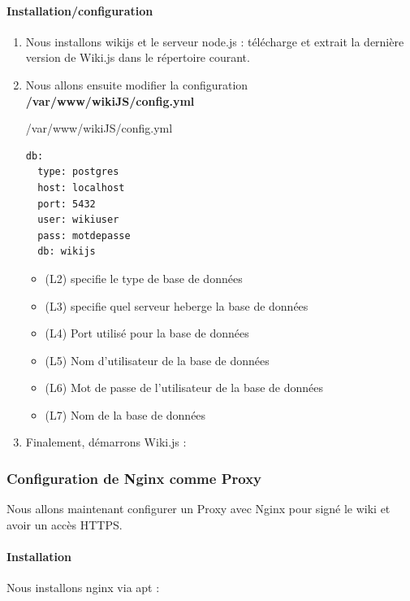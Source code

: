 \documentclass{article}
\begin{document}
\paragraph{Installation/configuration\\}
\begin{enumerate}
	\item Nous installons wikijs et le serveur node.js :
télécharge et extrait la dernière version de Wiki.js dans le répertoire courant.
	
	\item Nous allons ensuite modifier la configuration \textbf{/var/www/wikiJS/config.yml}
	\begin{configbox}{/var/www/wikiJS/config.yml}
	\begin{lstlisting}
db:
  type: postgres
  host: localhost
  port: 5432
  user: wikiuser
  pass: motdepasse
  db: wikijs
	\end{lstlisting}
	\end{configbox}
	\begin{itemize}
		\item (L2) specifie le type de base de données
		\item (L3) specifie quel serveur heberge la base de données
		\item (L4) Port utilisé pour la base de données
		\item (L5) Nom d'utilisateur de la base de données
		\item (L6) Mot de passe de l'utilisateur de la base de données
		\item (L7) Nom de la base de données
	\end{itemize}
	
	\item Finalement, démarrons Wiki.js :
\end{enumerate}

\subsubsection{Configuration de Nginx comme Proxy}
Nous allons maintenant configurer un Proxy avec Nginx pour signé le wiki et avoir un accès HTTPS.

\paragraph{Installation\\}
Nous installons nginx via apt :
\end{document}

